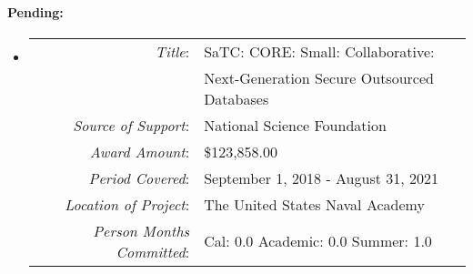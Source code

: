 \documentclass[10pt]{article}
\begin{document}
\paragraph{\bf Pending:}

\begin{itemize}
\item[]
  \begin{tabular} {r l}
    {\em Title}: & SaTC: CORE: Small: Collaborative: \\
     &  Next-Generation Secure Outsourced Databases \\
    {\em Source of Support}: & National Science Foundation \\
    {\em Award Amount}: & \$123,858.00 \\
    {\em Period Covered}: & September 1, 2018 - August 31, 2021\\
    {\em Location of Project}: & The United States Naval Academy \\
    {\em Person Months Committed}: & Cal: 0.0 Academic: 0.0 Summer: 1.0\\
 \end{tabular}

  

 


\end{itemize}
\end{document}

